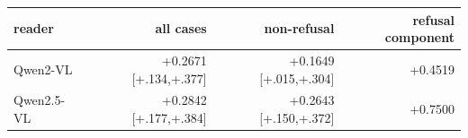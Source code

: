 \begin{tabular}{lrrr}
\toprule
reader & all cases & non-refusal & refusal component \\
\midrule
Qwen2-VL & +0.2671 [+.134,+.377] & +0.1649 [+.015,+.304] & +0.4519 \\
Qwen2.5-VL & +0.2842 [+.177,+.384] & +0.2643 [+.150,+.372] & +0.7500 \\
\bottomrule
\end{tabular}
